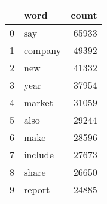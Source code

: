 \begin{tabular}{llr}
\toprule
{} &     word &  count \\
\midrule
0 &      say &  65933 \\
1 &  company &  49392 \\
2 &      new &  41332 \\
3 &     year &  37954 \\
4 &   market &  31059 \\
5 &     also &  29244 \\
6 &     make &  28596 \\
7 &  include &  27673 \\
8 &    share &  26650 \\
9 &   report &  24885 \\
\bottomrule
\end{tabular}
